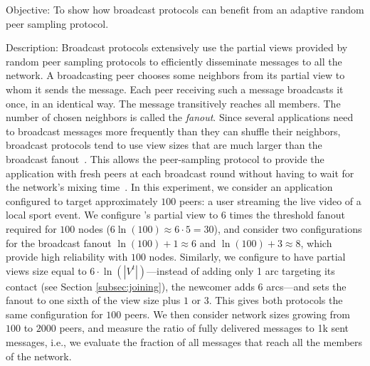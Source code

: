 \begin{asparadesc}
\item [Objective:] To show how broadcast protocols can benefit from
  an adaptive random peer sampling protocol.
\item [Description:] Broadcast protocols extensively use the partial views
  provided by random peer sampling protocols to efficiently disseminate messages
  to all the network. A broadcasting peer chooses some neighbors from its
  partial view to whom it sends the message. Each peer receiving such a message
  broadcasts it once, in an identical way. The message transitively reaches all
  members. The number of chosen neighbors is called the \emph{fanout}. Since
  several applications need to broadcast messages more frequently than they can
  shuffle their neighbors, broadcast protocols tend to use view sizes that are
  much larger than the broadcast fanout~\cite{Frey09Middleware}. This allows the
  peer-sampling protocol to provide the application with fresh peers at each
  broadcast round without having to wait for the network's mixing
  time~\cite{jelasity2007gossip}. In this experiment, we consider an application
  configured to target approximately $100$ peers: a user streaming the live
  video of a local sport event. We configure \CYCLON's partial view to $6$ times
  the threshold fanout required for $100$ nodes
  ($6 \ln(100) \approx 6 \cdot 5 = 30$), and consider two configurations for the
  broadcast fanout $\ln(100)+1 \approx 6 $ and $\ln(100)+3 \approx 8$, which
  provide high reliability with $100$ nodes. Similarly, we configure \SPRAY to
  have partial views size equal to $6 \cdot \ln(|V^t|)$---instead of adding only
  1 arc targeting its contact (see Section \ref{subsec:joining}), the newcomer
  adds 6 arcs---and sets the fanout to one sixth of the view size plus $1$ or
  $3$. This gives both protocols the same configuration for $100$ peers.  We
  then consider network sizes growing from $100$ to $2000$ peers, and measure
  the ratio of fully delivered messages to 1k sent messages, i.e., we evaluate
  the fraction of all messages that reach all the members of the network.


\end{asparadesc}

